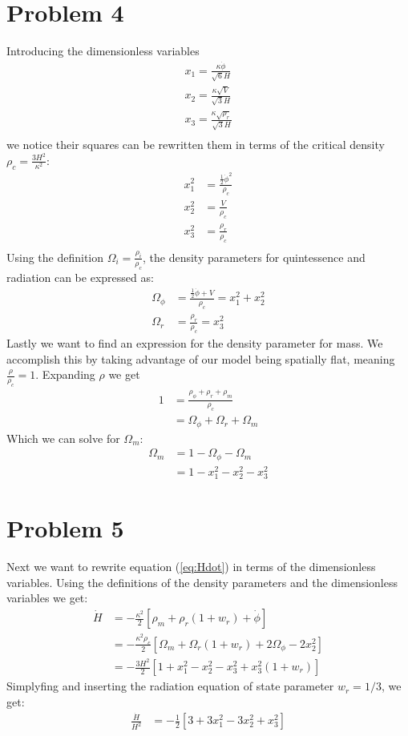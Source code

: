 \documentclass[reprint,english,notitlepage,nofootinbib]{revtex4-1}  %
\numberwithin{equation}{section}
\begin{document}
\section{Problem 4}\label{sec:4}
Introducing the dimensionless variables
\begin{align}
	x_1 = \frac{\kappa \dot{\phi}}{\sqrt{6}H} \\
	x_2 = \frac{\kappa \sqrt{V}}{\sqrt{3}H} \\
	x_3 = \frac{\kappa \sqrt{\rho_r}}{\sqrt{3}H} \\
\end{align}
we notice their squares can be rewritten them in terms of the critical density
$\rho_c = \frac{3H^2}{\kappa^2}$:
\begin{align}
	x_1^2 &= \frac{\frac{1}{2}\dot{\phi}^2}{\rho_c} \label{eq:x1} \\
	x_2^2 &= \frac{V}{\rho_c} \label{eq:x2} \\
	x_3^2 &= \frac{\rho_r}{\rho_c} \label{eq:x3} \\
\end{align}
Using the definition $\Omega_i = \frac{\rho_i}{\rho_c}$, the density parameters for quintessence and radiation can be expressed as:
\begin{align}
	\Omega_\phi &= \frac{\frac{1}{2}\dot{\phi} + V}{\rho_c} = x_1^2 + x_2^2 \\
	\Omega_r &= \frac{\rho_r}{\rho_c} = x_3^2
\end{align}
Lastly we want to find an expression for the density parameter for
mass. We accomplish this by taking advantage of our model being
spatially flat, meaning $\frac{\rho}{\rho_c} = 1$. Expanding $\rho$
we get
\begin{align}
	1 &= \frac{\rho_\phi + \rho_r + \rho_m}{\rho_c} \\
		&= \Omega_\phi + \Omega_r + \Omega_m
\end{align}
Which we can solve for $\Omega_m$:
\begin{align}
	\Omega_m &= 1 - \Omega_\phi - \Omega_m \\
					 &= 1 - x_1^2 - x_2^2 - x_3^2
\end{align}

\section{Problem 5}
Next we want to rewrite equation (\ref{eq:Hdot}) in terms of the dimensionless
variables. Using the definitions of the density parameters and the dimensionless
variables we get:
\begin{align}
	\dot{H} &= -\frac{\kappa^2}{2} \left[ \rho_m + \rho_r(1+w_r) + \dot{\phi}\right] \\
					&= -\frac{\kappa^2 \rho_c}{2}\left[\Omega_m + \Omega_r(1+w_r) + 2\Omega_\phi -2x_2^2\right] \\
					&= -\frac{3H^2}{2}\left[1 + x_1^2 -x_2^2 -x_3^2 + x_3^2(1+w_r)\right]
\end{align}
Simplyfing and inserting the radiation equation of state parameter $w_r = 1/3$,
we get:
\begin{align}
	\frac{\dot{H}}{H^2} &= -\frac{1}{2}\left[3+3x_1^2 -3x_2^2 + x_3^2\right] \label{eq:H_dim}
\end{align}
\end{document}
